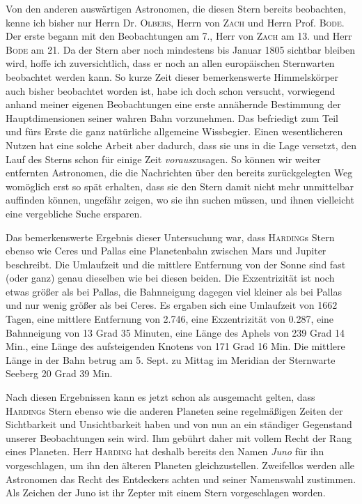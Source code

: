 Von den anderen auswärtigen Astronomen, die diesen Stern bereits beobachten, kenne ich bisher nur Herrn Dr. \textsc{Olbers}, Herrn von \textsc{Zach} und Herrn Prof. \textsc{Bode}. Der erste begann mit den Beobachtungen am 7., Herr von \textsc{Zach} am 13. und Herr \textsc{Bode} am 21. Da der Stern aber noch mindestens bis Januar 1805 sichtbar bleiben wird, hoffe ich zuversichtlich, dass er noch an allen europäischen Sternwarten beobachtet werden kann. So kurze Zeit dieser bemerkenswerte Himmelskörper auch bisher beobachtet worden ist, habe ich doch schon versucht, vorwiegend anhand meiner eigenen Beobachtungen eine erste annähernde Bestimmung der Hauptdimensionen seiner wahren Bahn vorzunehmen. Das befriedigt zum Teil und fürs Erste die ganz natürliche allgemeine Wissbegier. Einen wesentlicheren Nutzen hat eine solche Arbeit aber dadurch, dass sie uns in die Lage versetzt, den Lauf des Sterns schon für einige Zeit \emph{voraus}zusagen. So können wir weiter entfernten Astronomen, die die Nachrichten über den bereits zurückgelegten Weg womöglich erst so spät erhalten, dass sie den Stern damit nicht mehr unmittelbar auffinden können, ungefähr zeigen, wo sie ihn suchen müssen, und ihnen vielleicht eine vergebliche Suche ersparen.

Das bemerkenswerte Ergebnis dieser Untersuchung war, dass \textsc{Harding}s Stern ebenso wie Ceres und Pallas eine Planetenbahn zwischen Mars und Jupiter beschreibt. Die Umlaufzeit und die mittlere Entfernung von der Sonne sind fast (oder ganz) genau dieselben wie bei diesen beiden. Die Exzentrizität ist noch etwas größer als bei Pallas, die Bahnneigung dagegen viel kleiner als bei Pallas und nur wenig größer als bei Ceres. Es ergaben sich eine Umlaufzeit von 1662 Tagen, eine mittlere Entfernung von 2.746, eine Exzentrizität von 0.287, eine Bahnneigung von 13 Grad 35 Minuten, eine Länge des Aphels von 239 Grad 14 Min., eine Länge des aufsteigenden Knotens von 171 Grad 16 Min. Die mittlere Länge in der Bahn betrug am 5. Sept. zu Mittag im Meridian der Sternwarte Seeberg 20 Grad 39 Min.

Nach diesen Ergebnissen kann es jetzt schon als ausgemacht gelten, dass \textsc{Harding}s Stern ebenso wie die anderen Planeten seine regelmäßigen Zeiten der Sichtbarkeit und Unsichtbarkeit haben und von nun an ein ständiger Gegenstand unserer Beobachtungen sein wird. Ihm gebührt daher mit vollem Recht der Rang eines Planeten. Herr \textsc{Harding} hat deshalb bereits den Namen \emph{Juno} für ihn vorgeschlagen, um ihn den älteren Planeten gleichzustellen. Zweifellos werden alle Astronomen das Recht des Entdeckers achten und seiner Namenswahl zustimmen. Als Zeichen der Juno ist ihr Zepter mit einem Stern vorgeschlagen worden.

